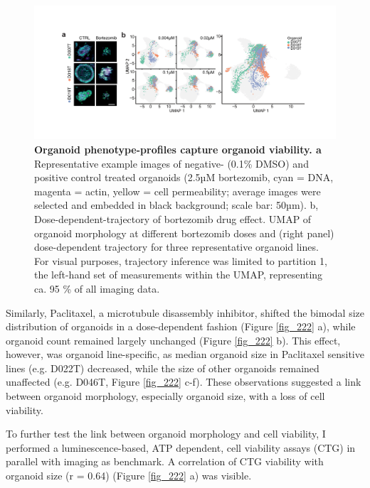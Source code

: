 \begin{flushleft}
\begin{figure}[h]
\centering
\includegraphics[width=\textwidth,
                height=\textheight,
                keepaspectratio]{figures/promise/pdf/fig_2_1.pdf}
\caption{\textbf{Organoid phenotype-profiles capture organoid viability. a} Representative example images of negative- (0.1\% DMSO) and positive control treated organoids (2.5µM bortezomib, cyan = DNA, magenta = actin, yellow = cell permeability; average images were selected and embedded in black background; scale bar: 50µm). b, Dose-dependent-trajectory of bortezomib drug effect. UMAP of organoid morphology at different bortezomib doses and (right panel) dose-dependent trajectory for three representative organoid lines. For visual purposes, trajectory inference was limited to partition 1, the left-hand set of measurements within the UMAP, representing ca. 95 \% of all imaging data.}
\label{fig_221}
\end{figure}
\bigbreak

Similarly, Paclitaxel, a microtubule disassembly inhibitor, shifted the bimodal size distribution of organoids in a dose-dependent fashion (Figure \ref{fig_222} a), while organoid count remained largely unchanged (Figure \ref{fig_222} b). This effect, however, was organoid line-specific, as median organoid size in Paclitaxel sensitive lines (e.g. D022T) decreased, while the size of other organoids remained unaffected (e.g. D046T, Figure \ref{fig_222} c-f). These observations suggested a link between organoid morphology, especially organoid size, with a loss of cell viability. 

\bigbreak
To further test the link between organoid morphology and cell viability, I performed a luminescence-based, ATP dependent, cell viability assays (CTG) in parallel with imaging as benchmark. A correlation of CTG viability with organoid size (r = 0.64) (Figure \ref{fig_222} a) was visible. 


\end{flushleft}
